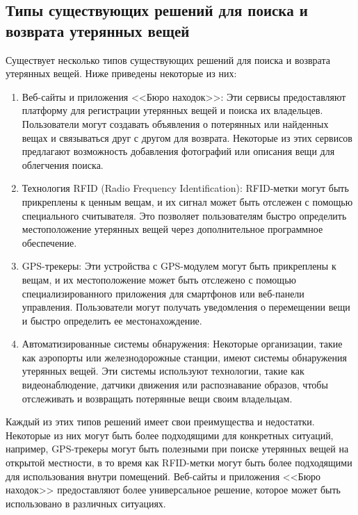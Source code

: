 \subsection{Типы существующих решений для поиска и возврата утерянных вещей}

Существует несколько типов существующих решений для поиска и возврата утерянных вещей. Ниже приведены некоторые из них:
\begin{enumerate}
	\item Веб-сайты и приложения <<Бюро находок>>: Эти сервисы предоставляют платформу для регистрации утерянных вещей и поиска их владельцев. Пользователи могут создавать объявления о потерянных или найденных вещах и связываться друг с другом для возврата. Некоторые из этих сервисов предлагают возможность добавления фотографий или описания вещи для облегчения поиска.
	
	\item Технология RFID (Radio Frequency Identification): RFID-метки могут быть прикреплены к ценным вещам, и их сигнал может быть отслежен с помощью специального считывателя. Это позволяет пользователям быстро определить местоположение утерянных вещей через дополнительное программное обеспечение.
	
	\item GPS-трекеры: Эти устройства с GPS-модулем могут быть прикреплены к вещам, и их местоположение может быть отслежено с помощью специализированного приложения для смартфонов или веб-панели управления. Пользователи могут получать уведомления о перемещении вещи и быстро определить ее местонахождение.
	
	\item Автоматизированные системы обнаружения: Некоторые организации, такие как аэропорты или железнодорожные станции, имеют системы обнаружения утерянных вещей. Эти системы используют технологии, такие как видеонаблюдение, датчики движения или распознавание образов, чтобы отслеживать и возвращать потерянные вещи своим владельцам.
\end{enumerate}

Каждый из этих типов решений имеет свои преимущества и недостатки. Некоторые из них могут быть более подходящими для конкретных ситуаций, например, GPS-трекеры могут быть полезными при поиске утерянных вещей на открытой местности, в то время как RFID-метки могут быть более подходящими для использования внутри помещений. Веб-сайты и приложения <<Бюро находок>> предоставляют более универсальное решение, которое может быть использовано в различных ситуациях.

